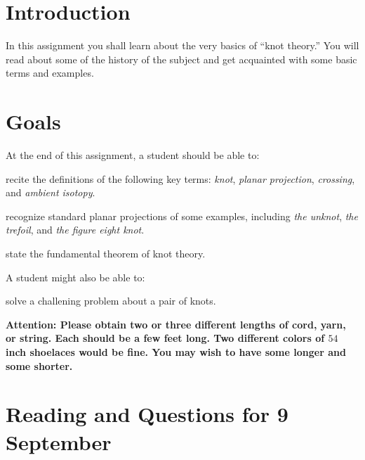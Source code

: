 \documentclass[12pt,letterpaper]{article}
\theoremstyle{definition}
\begin{document}
\setlength{\parskip}{1ex plus 0.5ex minus 0.2ex}
\setlength{\parindent}{0pt}

\pagestyle{fancy}
\cfoot{}

\section*{Introduction}
In this assignment you shall learn about the very basics of ``knot theory.''
You will read about some of the history of the subject and get acquainted with some basic terms and examples.

\section*{Goals}
At the end of this assignment, a student should be able to:
\begin{compactitem}
\item recite the definitions of the following key terms: \emph{knot}, \emph{planar projection}, \emph{crossing}, and \emph{ambient isotopy}.
\item recognize standard planar projections of some examples, including \emph{the unknot}, \emph{the trefoil}, and \emph{the figure eight knot}.
\item state the fundamental theorem of knot theory.
\end{compactitem}
A student might also be able to:
\begin{compactitem}
\item solve a challening problem about a pair of knots.
\end{compactitem}

\begin{center}
\textbf{
Attention:
Please obtain two or three different lengths of cord, yarn, or string. 
Each should be a few feet long. 
Two different colors of $54$ inch shoelaces would be fine. 
You may wish to have some longer and some shorter.
}
\end{center}

\section*{Reading and Questions for 9 September}
\end{document}
